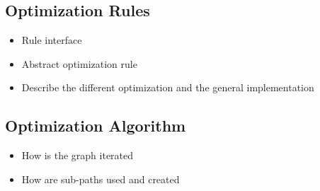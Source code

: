 \subsection{Optimization Rules}
\begin{itemize}
    \item Rule interface
    \item Abstract optimization rule
    \item Describe the different optimization and the general implementation
\end{itemize}

\subsection{Optimization Algorithm}
\begin{itemize}
    \item How is the graph iterated\
    \item How are sub-paths used and created
\end{itemize}
